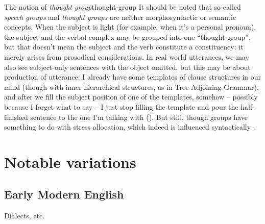 \documentclass[UTF8, a4paper, oneside, scheme=plain]{ctexrep}
\newcommand*{\citepage}[1]{p.~{#1}}
\newcommand*{\term}[1]{\emph{#1}}
\begin{document}
\begin{infobox}{The notion of \term{thought group}}{thought-group}
    It should be noted that so-called \term{speech groups}
    and \term{thought groups}
    are neither morphosyntactic or semantic concepts.
    When the subject is light (for example, when it's a personal pronoun),
    the subject and the verbal complex may be grouped into one ``thought group'',
    but that doesn't mean the subject and the verb constitute a constituency:
    it merely arises from prosodical considerations.
    In real world utterances, 
    we may also see subject-only sentences with the object omitted,
    but this may be about production of utterance:
    I already have some templates of clause structures in our mind
    (though with inner hierarchical structures, as in Tree-Adjoining Grammar),
    and after we fill the subject position of one of the templates,
    somehow -- possibly because I forget what to say -- 
    I just stop filling the template and pour the half-finished sentence 
    to the one I'm talking with
    ().
    But still, though groups have something to do with stress allocation,
    which indeed is influenced syntactically \citep[\citepage{7}]{kahnemuyipour2009syntax}. 
\end{infobox}

\chapter{Notable variations}

\section{Early Modern English}

Dialects, etc.





\end{document}
